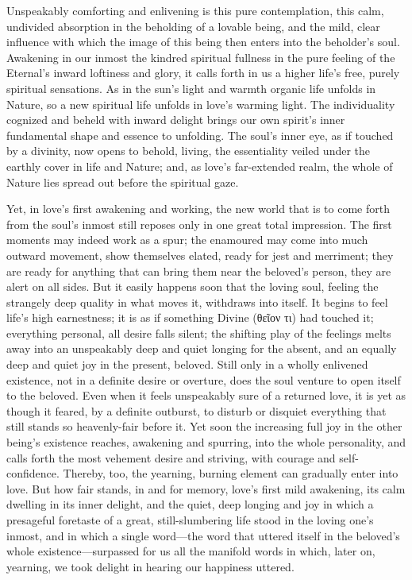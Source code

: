 \documentclass[12pt,a4paper]{book}
\begin{document}
Unspeakably comforting and enlivening is this pure contemplation, this
calm, undivided absorption in the beholding of a lovable being, and the
mild, clear influence with which the image of this being then enters into
the beholder's soul. Awakening in our inmost the kindred spiritual fullness
in the pure feeling of the Eternal's inward loftiness and glory, it calls
forth in us a higher life's free, purely spiritual sensations. As in the
sun's light and warmth organic life unfolds in Nature, so a new spiritual
life unfolds in love's warming light. The individuality cognized and
beheld with inward delight brings our own spirit's inner fundamental shape
and essence to unfolding. The soul's inner eye, as if touched by a
divinity, now opens to behold, living, the essentiality veiled under the
earthly cover in life and Nature; and, as love's far-extended realm, the
whole of Nature lies spread out before the spiritual gaze.

Yet, in love's first awakening and working, the new world that is to come
forth from the soul's inmost still reposes only in one great total
impression. The first moments may indeed work as a spur; the enamoured may
come into much outward movement, show themselves elated, ready for jest and
merriment; they are ready for anything that can bring them near the
beloved's person, they are alert on all sides. But it easily happens soon
that the loving soul, feeling the strangely deep quality in what moves it,
withdraws into itself. It begins to feel life's high earnestness; it is as
if something Divine (θεῖον τι) had touched it; everything
personal, all desire falls silent; the shifting play of the feelings melts
away into an unspeakably deep and quiet longing for the absent, and an
equally deep and quiet joy in the present, beloved. Still only in a wholly
enlivened existence, not in a definite desire or overture, does the soul
venture to open itself to the beloved. Even when it feels unspeakably sure
of a returned love, it is yet as though it feared, by a definite outburst,
to disturb or disquiet everything that still stands so heavenly-fair before
it. Yet soon the increasing full joy in the other being's existence
reaches, awakening and spurring, into the whole personality, and calls
forth the most vehement desire and striving, with courage and
self-confidence. Thereby, too, the yearning, burning element can gradually
enter into love. But how fair stands, in and for memory, love's first mild
awakening, its calm dwelling in its inner delight, and the quiet, deep
longing and joy in which a presageful foretaste of a great, still-slumbering
life stood in the loving one's inmost, and in which a single word---the word
that uttered itself in the beloved's whole existence---surpassed for us all
the manifold words in which, later on, yearning, we took delight in hearing
our happiness uttered.
\end{document}
